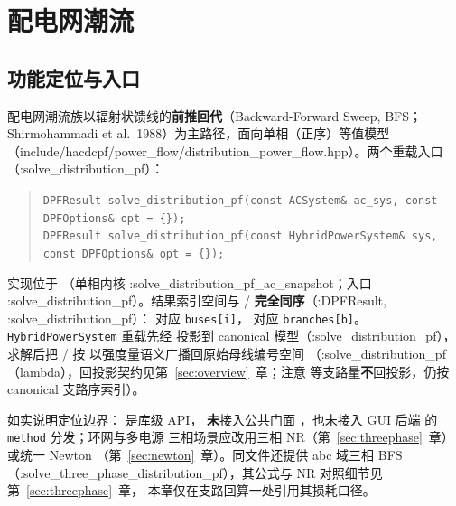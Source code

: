 \section{配电网潮流}\label{sec:dist}\label{sec:distribution}

\subsection{功能定位与入口}


配电网潮流族以辐射状馈线的\textbf{前推回代}（Backward-Forward Sweep, BFS；
Shirmohammadi et al.\ 1988）为主路径，面向单相（正序）等值模型
（include/hacdcpf/power\_flow/distribution\_power\_flow.hpp）。两个重载入口（:solve\_distribution\_pf）：
\begin{quote}\footnotesize
\texttt{DPFResult solve\_distribution\_pf(const ACSystem\& ac\_sys, const DPFOptions\& opt = \{\});}\\
\texttt{DPFResult solve\_distribution\_pf(const HybridPowerSystem\& sys, const DPFOptions\& opt = \{\});}
\end{quote}
实现位于 （单相内核
:solve\_distribution\_pf\_ac\_snapshot；入口 :solve\_distribution\_pf）。结果索引空间与 /
\textbf{完全同序}（:DPFResult, :solve\_distribution\_pf）： 对应
\texttt{buses[i]}， 对应 \texttt{branches[b]}。
\texttt{HybridPowerSystem} 重载先经 
投影到 canonical 模型（:solve\_distribution\_pf），求解后把 /
按  以强度量语义广播回原始母线编号空间
（:solve\_distribution\_pf（lambda），回投影契约见第~\ref{sec:overview}~章；注意
 等支路量\textbf{不}回投影，仍按 canonical 支路序索引）。

如实说明定位边界： 是库级 API，
\textbf{未}接入公共门面 ，也未接入 GUI
后端  的 \texttt{method} 分发；环网与多电源
三相场景应改用三相 NR（第~\ref{sec:threephase}~章）或统一 Newton
（第~\ref{sec:newton}~章）。同文件还提供 abc 域三相 BFS
（:solve\_three\_phase\_distribution\_pf），其公式与 NR 对照细节见第~\ref{sec:threephase}~章，
本章仅在支路回算一处引用其损耗口径。

